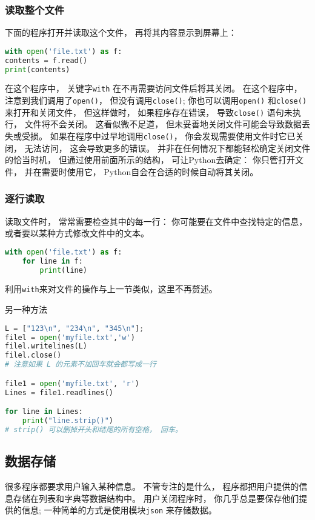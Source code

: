 \subsubsection{读取整个文件}
下面的程序打开并读取这个文件， 再将其内容显示到屏幕上：
\begin{lstlisting}[language=python]
with open('file.txt') as f:
contents = f.read()
print(contents)
\end{lstlisting}
在这个程序中， 关键字\verb|with| 在不再需要访问文件后将其关闭。 在这个程序中， 注意到我们调用了\verb|open()|， 但没有调用\verb|close()|; 你也可以调用\verb|open()| 和\verb|close()| 来打开和关闭文件， 但这样做时， 如果程序存在错误， 导致\verb|close()| 语句未执行， 文件将不会关闭。 这看似微不足道， 但未妥善地关闭文件可能会导致数据丢失或受损。 如果在程序中过早地调用\verb|close()|， 你会发现需要使用文件时它已关闭， 无法访问， 这会导致更多的错误。 并非在任何情况下都能轻松确定关闭文件的恰当时机， 但通过使用前面所示的结构， 可让Python去确定： 你只管打开文件， 并在需要时使用它， Python自会在合适的时候自动将其关闭。

\subsubsection{逐行读取}
读取文件时， 常常需要检查其中的每一行： 你可能要在文件中查找特定的信息， 或者要以某种方式修改文件中的文本。
\begin{lstlisting}[language=python]
with open('file.txt') as f:
    for line in f:
        print(line)
\end{lstlisting}

利用\verb|with|来对文件的操作与上一节类似，这里不再赘述。

另一种方法
\begin{lstlisting}[language=python]
L = ["123\n", "234\n", "345\n"];
filel = open('myfile.txt','w')
filel.writelines(L)
filel.close()
# 注意如果 L 的元素不加回车就会都写成一行

file1 = open('myfile.txt', 'r')
Lines = file1.readlines()

for line in Lines:
    print("line.strip()")
# strip() 可以删掉开头和结尾的所有空格， 回车。
\end{lstlisting}

\subsection{数据存储}
很多程序都要求用户输入某种信息。 不管专注的是什么， 程序都把用户提供的信息存储在列表和字典等数据结构中。  用户关闭程序时， 你几乎总是要保存他们提供的信息; 一种简单的方式是使用模块\verb|json| 来存储数据。

